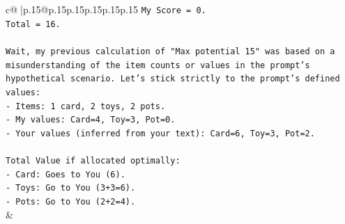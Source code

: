 \documentclass{article}
\begin{document}
{\begin{supertabular}{c@{$\;$}|p{.15\linewidth}@{}p{.15\linewidth}p{.15\linewidth}p{.15\linewidth}p{.15\linewidth}p{.15\linewidth}}
{{{\texttt{My Score = 0.} \\
\texttt{Total = 16.} \\
\\ 
\texttt{Wait, my previous calculation of "Max potential 15" was based on a misunderstanding of the item counts or values in the prompt's hypothetical scenario. Let's stick strictly to the prompt's defined values:} \\
\texttt{{-} Items: 1 card, 2 toys, 2 pots.} \\
\texttt{{-} My values: Card=4, Toy=3, Pot=0.} \\
\texttt{{-} Your values (inferred from your text): Card=6, Toy=3, Pot=2.} \\
\\ 
\texttt{Total Value if allocated optimally:} \\
\texttt{{-} Card: Goes to You (6).} \\
\texttt{{-} Toys: Go to You (3+3=6).} \\
\texttt{{-} Pots: Go to You (2+2=4).} \\
            }
        }
    }
    & \\ \\


\end{supertabular}}
\end{document}
